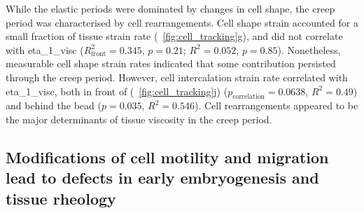 While the elastic periods were dominated by changes in cell shape, the creep period was characterised by cell rearrangements.
Cell shape strain accounted for a small fraction of tissue strain rate (\figurename~\ref{fig:cell_tracking}g), and did not correlate with \gls{eta_1_visc}
(\(R_\text{front}^2 = 0.345\), \(p = 0.21\); \(R^2 =	0.052\), \(p = 0.85\)).
Nonetheless, measurable cell shape strain rates indicated that some contribution persisted through the creep period.
However, cell intercalation strain rate correlated with \gls{eta_1_visc}, both in front of (\figurename~\ref{fig:cell_tracking}j)
(\(p_\text{correlation} = 0.0638\), \(R^2 = 0.49\)) and behind the bead (\(p = 0.035\), \(R^2 =	0.546\)).
Cell rearrangements appeared to be the major determinants of tissue viscosity in the creep period.


%
\subsection{Modifications of cell motility and migration lead to defects in early embryogenesis and tissue rheology}

